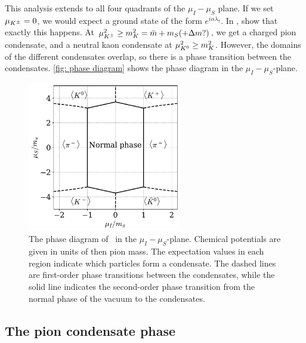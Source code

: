 %
This analysis extends to all four quadrants of the $\mu_I-\mu_S$ plane.
If we set $\mu_{K^\pm} = 0$, we would expect a ground state of the form $e^{i\alpha\lambda_7}$.
In \autocite{kogutQCDSmallNonzero2001}, \citeauthor{kogutQCDSmallNonzero2001} show that exactly this happens. 
At $\mu_{K^\pm}^2 \geq m_K^2 = \bar m + m_S(+\Delta m?)$, we get a charged pion condensate, and a neutral kaon condensate at $\mu_{K^0}^2 \geq m_K^2$.
However, the domains of the different condensates overlap, so there is a phase transition between the condensates.
\autoref{fig: phase diagram} shows the phase diagram in the $\mu_I-\mu_S$-plane.

\begin{figure}[!htb]
    \centering
    \includegraphics[width=0.6\textwidth]{../scripts/figurer/phase_diagram.pdf}
    \caption{
        The phase diagram of \chpt\ in the $\mu_I-\mu_S$-plane.
        Chemical potentials are given in units of then pion mass.
        The expectation values in each region indicate which particles form a condensate.
        The dashed lines are first-order phase transitions between the condensates, while the solid line indicates the second-order phase transition from the normal phase of the vacuum to the condensates.
        }
    \label{fig: phase diagram}
\end{figure}



\subsection{The pion condensate phase}

